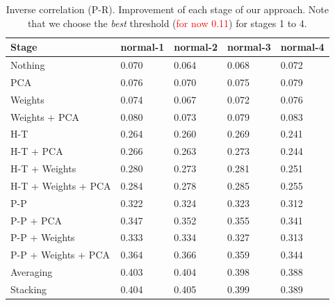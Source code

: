 \documentclass[wcp]{jmlr}
\begin{document}
\begin{table}[htb]
\centering
\caption{Inverse correlation (P-R). Improvement of each stage of our approach. Note that we choose the
         \textit{best} threshold (\textcolor{red}{for now 0.11}) for stages 1 to 4.}
\begin{tabular}{*{5}{l}}
\toprule
Stage               & normal-1 & normal-2 & normal-3 & normal-4 \\
\midrule
Nothing             & 0.070 & 0.064 & 0.068 & 0.072\\
PCA                 & 0.076 & 0.070 & 0.075 & 0.079\\
Weights             & 0.074 & 0.067 & 0.072 & 0.076\\
Weights + PCA       & 0.080 & 0.073 & 0.079 & 0.083\\
H-T                 & 0.264 & 0.260 & 0.269 & 0.241\\
H-T + PCA           & 0.266 & 0.263 & 0.273 & 0.244\\
H-T + Weights       & 0.280 & 0.273 & 0.281 & 0.251\\
H-T + Weights + PCA & 0.284 & 0.278 & 0.285 & 0.255\\
P-P                 & 0.322 & 0.324 & 0.323 & 0.312\\
P-P + PCA           & 0.347 & 0.352 & 0.355 & 0.341\\
P-P + Weights       & 0.333 & 0.334 & 0.327 & 0.313\\
P-P + Weights + PCA & 0.364 & 0.366 & 0.359 & 0.344\\
Averaging           & 0.403 & 0.404 & 0.398 & 0.388\\
Stacking            & 0.404 & 0.405 & 0.399 & 0.389\\
\bottomrule
\end{tabular}
\end{table}



\end{document}
